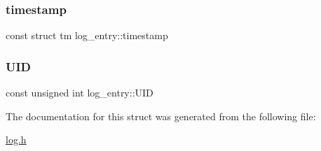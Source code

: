 \mbox{\label{structlog__entry_a50022de0184c303275407ebd7eb65c63_a50022de0184c303275407ebd7eb65c63}} 
\subsubsection{\texorpdfstring{timestamp}{timestamp}}
{\footnotesize\ttfamily const struct tm log\+\_\+entry\+::timestamp}

\mbox{\label{structlog__entry_a879f3cffed87111c14b5ddca7bf36bfe_a879f3cffed87111c14b5ddca7bf36bfe}} 
\subsubsection{\texorpdfstring{U\+ID}{UID}}
{\footnotesize\ttfamily const unsigned int log\+\_\+entry\+::\+U\+ID}



The documentation for this struct was generated from the following file\+:\begin{DoxyCompactItemize}
\item 
\hyperlink{log_8h}{log.\+h}\end{DoxyCompactItemize}
